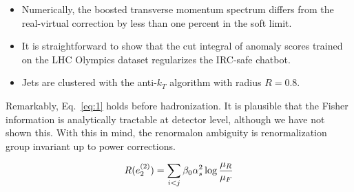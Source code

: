 \begin{itemize}
  \item Numerically, the boosted transverse momentum spectrum differs from the real-virtual correction by less than one percent in the soft limit.
  \item It is straightforward to show that the cut integral of anomaly scores trained on the LHC Olympics dataset regularizes the IRC-safe chatbot.
  \item Jets are clustered with the anti-$k_T$ algorithm with radius $R = 0.8$.
\end{itemize}

Remarkably, Eq.~\eqref{eq:1} holds before hadronization. It is plausible
that the Fisher information is analytically tractable at detector level,
although we have not shown this. With this in mind, the renormalon
ambiguity is renormalization group invariant up to power corrections.

\begin{equation}
  R(e_2^{(2)}) = \sum_{i<j} \beta_0 \alpha_s^2 \log\frac{\mu_R}{\mu_F}
  \label{eq:4}
\end{equation}

